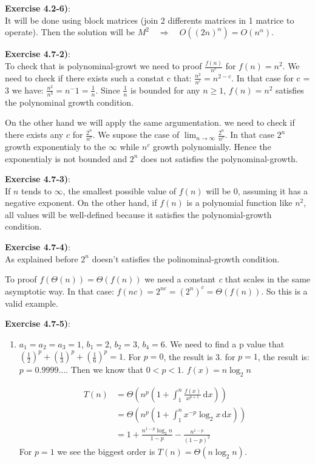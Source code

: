 \documentclass{article}
\newcounter{exercise}[section]   %
\begin{document}
\textbf{Exercise 4.2-6)}:\\
It will be done using block matrices (join 2 differents matrices in 1 matrice to operate).
Then the solution will be \(M^2 \quad \Rightarrow \quad O((2n)^\alpha) = O(n^\alpha)\).

\textbf{Exercise 4.7-2)}:\\
To check that is polynominal-growt we need to proof \(\frac{f(n)}{n^c}\) for \(f(n) = n^2\).
We need to check if  there exists such a constat c that: \(\frac{n^2}{n^c} = n^{2 - c}\).
In that case for c = 3 we have: \(\frac{n^2}{n^3} = n^-1 = \frac{1}{n}\). Since \(\frac{1}{n}\)
is bounded for any \(n \geq 1\), \(f(n) = n^2\) satisfies the polynominal growth condition.

On the other hand we will apply the same argumentation. we need to check if there exists any
\(c\) for \(\frac{2^n}{n^c}\). We supose the case of \(\lim_{n \to \infty} \frac{2^n}{n^c}\).
In that case \(2^n\) growth exponentialy to the \(\infty\) while \(n^c\) growth polynomially.
Hence the exponentialy is not bounded and \(2^n\) does not satisfies the polynominal-growth.

\textbf{Exercise 4.7-3)}:\\
If \( n \) tends to \( \infty \), the smallest possible value of \( f(n) \) will be 0, 
assuming it has a negative exponent. On the other hand, if \( f(n) \) is a polynomial
function like \( n^2 \), all values will be well-defined because it satisfies the 
polynomial-growth condition.

\textbf{Exercise 4.7-4)}:\\
As explained before \(2^n\) doesn't satisfies the polinominal-growth condition.

To proof \(f(\Theta(n)) = \Theta(f(n))\) we need a constant \textit{c} that scales in the 
same asymptotic way. In that case: \(f(nc) = 2^{nc} = (2^n)^c = \Theta(f(n))\). So this is 
a valid example.

\textbf{Exercise 4.7-5)}:
\begin{enumerate}[label=\alph*)]
    \item \(a_1 = a_2 = a_3 = 1\), \(b_1 = 2\), \(b_2 = 3\), \(b_4 = 6\).
    We need to find a p value that \(\left(\frac{1}{2}\right)^p + \left(\frac{1}{3}\right)
    ^p + \left(\frac{1}{6}\right)^p = 1\). For \(p = 0\), the result is 3. for \(p = 1\), 
    the result is: \(p = 0.9999...\). Then we know that \(0 < p < 1\). \(f(x) = n\log_2 n\)

    \begin{align*}
        T(n) &= \Theta\left(n^p\left(1 + \int_{1}^{n}\frac{f(x)}{x^{p + 1}}\,\mathrm{d}x \right)\right) \\
        &= \Theta\left(n^p\left(1 + \int_{1}^{n}x^{-p}\log_2 x\,\mathrm{d}x \right)\right) \\
        &= 1 + \frac{n^{1 - p}\log_2 n}{1 - p} - \frac{n^{1 - p}}{(1 - p)^2}
    \end{align*}
    For \(p = 1\) we see the biggest order is \(T(n) = \Theta(n\log_2 n)\).
\end{enumerate}
\end{document}
